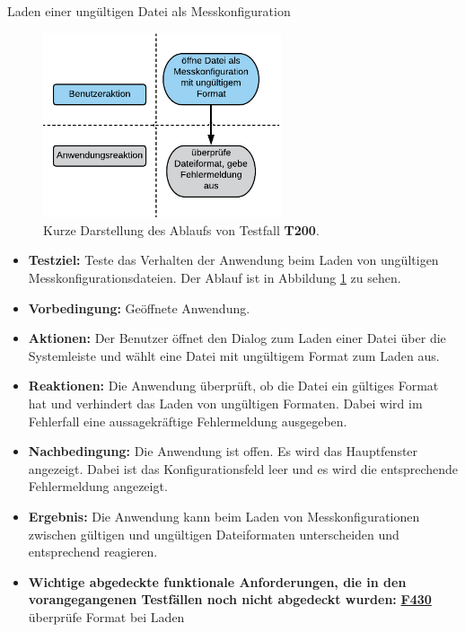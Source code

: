 \documentclass[parskip=full]{scrartcl}
\begin{document}
\begin{description} 

\hypertarget{link-t200}{\item[T200]} Laden einer ungültigen Datei als Messkonfiguration

\begin{figure}[htbp]
	\begin{center}
		\includegraphics[width = 7cm]{Grafik/T200-Ablauf.png}
		\caption{Kurze Darstellung des Ablaufs von Testfall \textbf{T200}.}
		\label{T200-Ablauf}
	\end{center}
\end{figure}
\begin{itemize}

\item []\textbf{Testziel:} Teste das Verhalten der Anwendung beim Laden von ungültigen Messkonfigurationsdateien. Der Ablauf ist in Abbildung \ref{T200-Ablauf} zu sehen.

\item []\textbf{Vorbedingung:} Geöffnete Anwendung.
\item []\textbf{Aktionen:} Der Benutzer öffnet den Dialog zum Laden einer Datei über die Systemleiste und wählt eine Datei mit ungültigem Format zum Laden aus.
\item []\textbf{Reaktionen:} Die Anwendung überprüft, ob die Datei ein gültiges Format hat und verhindert das Laden von ungültigen Formaten. Dabei wird  im Fehlerfall eine aussagekräftige Fehlermeldung ausgegeben.
\item []\textbf{Nachbedingung:} Die Anwendung ist offen. Es wird das Hauptfenster angezeigt. Dabei ist das Konfigurationsfeld leer und es wird die entsprechende Fehlermeldung angezeigt. 


\item []\textbf{Ergebnis:} Die Anwendung kann beim Laden von Messkonfigurationen zwischen gültigen und ungültigen Dateiformaten unterscheiden und entsprechend reagieren.
\item []\textbf{Wichtige abgedeckte funktionale Anforderungen, die in den vorangegangenen Testfällen noch nicht abgedeckt wurden:} \hyperlink{link-f430}{\textbf{F430}} überprüfe Format bei Laden


\end{itemize}
\end{description}
\end{document}
